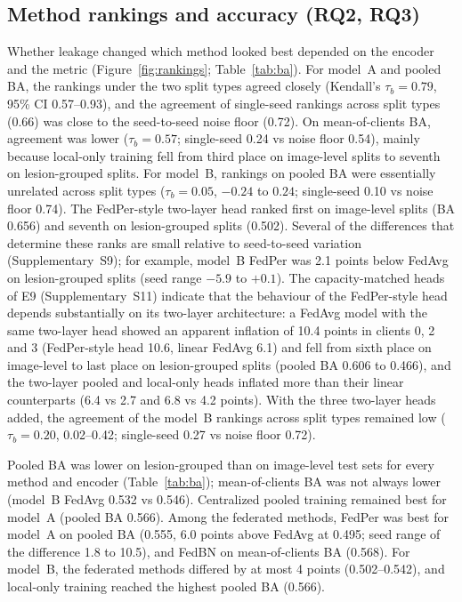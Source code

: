 
\subsection{Method rankings and accuracy (RQ2, RQ3)}
\label{sec:res-rankings}

Whether leakage changed which method looked best depended on the encoder and the metric
(Figure~\ref{fig:rankings}; Table~\ref{tab:ba}). For model~A and pooled BA, the rankings under the two
split types agreed closely (Kendall's $\tau_b=0.79$, 95\% CI 0.57--0.93), and the agreement of single-seed
rankings across split types (0.66) was close to the seed-to-seed noise floor (0.72). On mean-of-clients
BA, agreement was lower ($\tau_b=0.57$; single-seed 0.24 vs noise floor 0.54), mainly because local-only
training fell from third place on image-level splits to seventh on lesion-grouped splits. For model~B,
rankings on pooled BA were essentially unrelated across split types ($\tau_b=0.05$, $-0.24$ to $0.24$;
single-seed 0.10 vs noise floor 0.74). The FedPer-style two-layer head ranked first on image-level splits
(BA 0.656) and seventh on lesion-grouped splits (0.502). Several of the differences that determine these
ranks are small relative to seed-to-seed variation (Supplementary~S9); for example, model~B FedPer was
2.1 points below FedAvg on lesion-grouped splits (seed range $-5.9$ to $+0.1$). The capacity-matched heads of E9 (Supplementary~S11) indicate that the behaviour of the
FedPer-style head depends substantially on its two-layer architecture: a FedAvg model
with the same two-layer head showed an apparent inflation of 10.4 points in clients 0, 2 and 3 (FedPer-style
head 10.6, linear FedAvg 6.1) and fell from sixth place on image-level to last place on lesion-grouped
splits (pooled BA 0.606 to 0.466), and the two-layer pooled and local-only heads inflated more than their
linear counterparts (6.4 vs 2.7 and 6.8 vs 4.2 points). With the three two-layer heads added, the agreement
of the model~B rankings across split types remained low ($\tau_b=0.20$, 0.02--0.42; single-seed 0.27 vs
noise floor 0.72).

Pooled BA was lower on lesion-grouped than on image-level test sets for every method and encoder
(Table~\ref{tab:ba}); mean-of-clients BA was not always lower (model~B FedAvg 0.532 vs 0.546). Centralized
pooled training remained best for model~A (pooled BA 0.566). Among the federated methods, FedPer was best
for model~A on pooled BA (0.555, 6.0 points above FedAvg at 0.495; seed range of the difference 1.8 to
10.5), and FedBN on mean-of-clients BA (0.568). For model~B, the federated methods differed by at most
4 points (0.502--0.542), and local-only training reached the highest pooled BA (0.566).


